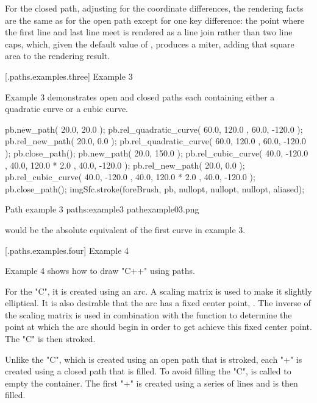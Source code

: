 \pnum
For the closed path, adjusting for the coordinate differences, the rendering facts are the same as for the open path except for one key difference: the point where the first line and last line meet is rendered as a line join rather than two line caps, which, given the default value of , produces a miter, adding that square area to the rendering result.

 [\iotwod.paths.examples.three] {Example 3}

\pnum
Example 3 demonstrates open and closed paths each containing either a quadratic curve or a cubic curve.

\begin{codeblock}
pb.new_path({ 20.0, 20.0 });
pb.rel_quadratic_curve({ 60.0, 120.0 }, { 60.0, -120.0 });
pb.rel_new_path({ 20.0, 0.0 });
pb.rel_quadratic_curve({ 60.0, 120.0 }, { 60.0, -120.0 });
pb.close_path();
pb.new_path({ 20.0, 150.0 });
pb.rel_cubic_curve({ 40.0, -120.0 }, { 40.0, 120.0 * 2.0 },
  { 40.0, -120.0 });
pb.rel_new_path({ 20.0, 0.0 });
pb.rel_cubic_curve({ 40.0, -120.0 }, { 40.0, 120.0 * 2.0 },
  { 40.0, -120.0 });
pb.close_path();
imgSfc.stroke(foreBrush, pb, nullopt, nullopt, nullopt, aliased);
\end{codeblock}

\begin{importgraphiciotwod}
{Path example 3}
{paths:example3}
{pathexample03.png}
\end{importgraphiciotwod}

\FloatBarrier

\pnum
\begin{note}
 would be the absolute equivalent of the first curve in example 3.
\end{note}

 [\iotwod.paths.examples.four] {Example 4}

\pnum
Example 4 shows how to draw "C++" using paths.

\pnum
For the "C", it is created using an arc. A scaling matrix is used to make it  slightly elliptical. It is also desirable that the arc has a fixed center point, . The inverse of the scaling matrix is used in combination with the  function to determine the point at which the arc should begin in order to get achieve this fixed center point. The "C" is then stroked.

\pnum
Unlike the "C", which is created using an open path that is stroked, each "+" is created using a closed path that is filled. To avoid filling the "C",  is called to empty the container. The first "+" is created using a series of lines and is then filled.

